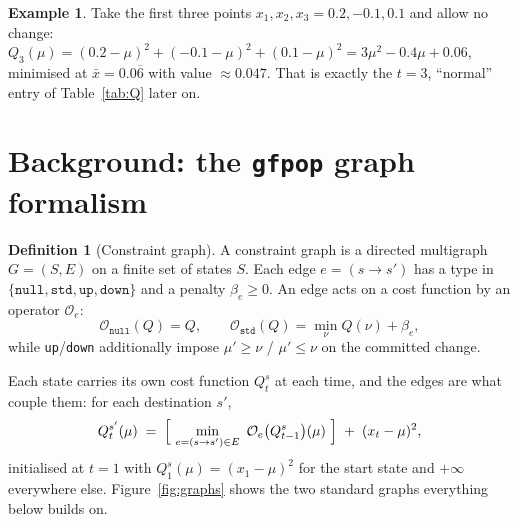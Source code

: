 \documentclass[11pt]{article}
\theoremstyle{definition}
\newtheorem{definition}{Definition}[section]
\newtheorem{example}{Example}[section]
\theoremstyle{plain}
\theoremstyle{remark}
\newcommand{\Op}{\mathcal{O}}
\begin{document}
\begin{example}\label{ex:micro}
Take the first three points $x_1,x_2,x_3 = 0.2,-0.1,0.1$ and allow no change:
$Q_3(\mu)=(0.2-\mu)^2+(-0.1-\mu)^2+(0.1-\mu)^2 = 3\mu^2-0.4\mu+0.06$, minimised
at $\bar x=0.0\overline{6}$ with value $\approx 0.047$. That is exactly the
$t=3$, ``normal'' entry of Table~\ref{tab:Q} later on.
\end{example}

\section{Background: the \texttt{gfpop} graph formalism}\label{sec:back-graph}

\begin{definition}[Constraint graph]
A constraint graph is a directed multigraph $G=(S,E)$ on a finite set of states
$S$. Each edge $e=(s\to s')$ has a type in $\{\texttt{null},\texttt{std},
\texttt{up},\texttt{down}\}$ and a penalty $\beta_e\ge 0$. An edge acts on a cost
function by an operator $\Op_e$:
\[
  \Op_{\texttt{null}}(Q)=Q,\qquad
  \Op_{\texttt{std}}(Q)=\min_\nu Q(\nu)+\beta_e,
\]
while \texttt{up}/\texttt{down} additionally impose $\mu'\ge\nu$ / $\mu'\le\nu$
on the committed change.
\end{definition}

Each state carries its own cost function $Q_t^{s}$ at each time, and the edges
are what couple them: for each destination $s'$,
\begin{equation}\label{eq:gfpop-rec}
  Q_{t}^{s'}(\mu) \;=\; \Bigl[\ \min_{e=(s\to s')\in E}\ \Op_e\bigl(Q_{t-1}^{s}\bigr)(\mu)\ \Bigr]
      \;+\; (x_{t}-\mu)^2 ,
\end{equation}
initialised at $t=1$ with $Q_1^{s}(\mu)=(x_1-\mu)^2$ for the start state and
$+\infty$ everywhere else. Figure~\ref{fig:graphs} shows the two standard graphs
everything below builds on.
\end{document}
